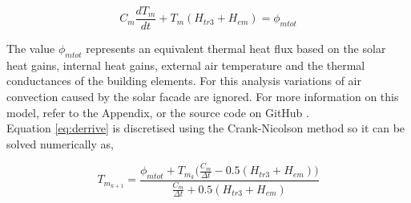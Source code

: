 

\begin{equation} 
\label{eq:derrive}
     C_m {\frac{dT_m}{dt}} + T_m(H_{tr3}+H_{em})  = \phi_{mtot}
\end{equation}

The value $\phi_{mtot}$ represents an equivalent thermal heat flux based on the solar heat gains, internal heat gains, external air temperature and the thermal conductances of the building elements. For this analysis variations of air convection caused by the solar facade are ignored. For more information on this model, refer to the Appendix, or the source code on GitHub \cite{RCGitHub}. \\





Equation \ref{eq:derrive} is discretised using the Crank-Nicolson method so it can be solved numerically as,


\begin{equation} 
\label{eq:derivation}
      T_{m_{k+1}}={\frac{\phi_{mtot}+T_{m_k}\Big(\frac{C_m}{\Delta t} - 0.5(H_{tr3}+H_{em})\Big)}{\frac{C_m}{\Delta t} + 0.5(H_{tr3}+H_{em})}}
\end{equation}

